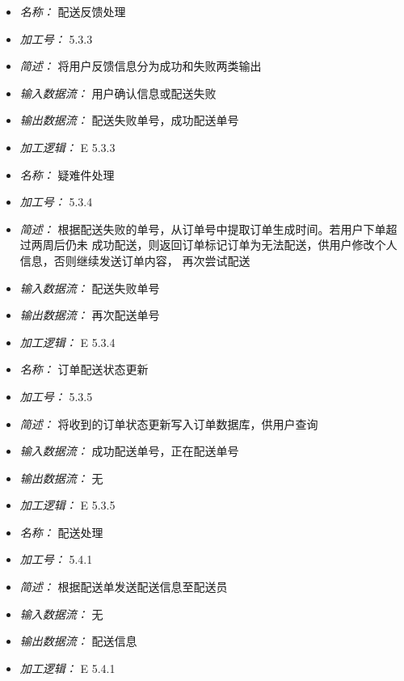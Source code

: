 \vspace{-1mm}


\begin{itemize}
\item \textit{名称： }配送反馈处理
\item \textit{加工号： }5.3.3
\item \textit{简述： } 将用户反馈信息分为成功和失败两类输出
\item \textit{输入数据流： } 用户确认信息或配送失败 
\item \textit{输出数据流： } 配送失败单号，成功配送单号 
\item \textit{加工逻辑： } E 5.3.3

\end{itemize}


\vspace{-1mm}


\begin{itemize}
\item \textit{名称： }疑难件处理
\item \textit{加工号： }5.3.4
\item \textit{简述： } 根据配送失败的单号，从订单号中提取订单生成时间。若用户下单超过两周后仍未 成功配送，则返回订单标记订单为无法配送，供用户修改个人信息，否则继续发送订单内容， 再次尝试配送
\item \textit{输入数据流： } 配送失败单号
\item \textit{输出数据流： } 再次配送单号
\item \textit{加工逻辑： } E 5.3.4

\end{itemize}


\vspace{-1mm}


\begin{itemize}
\item \textit{名称： }订单配送状态更新
\item \textit{加工号： }5.3.5
\item \textit{简述： } 将收到的订单状态更新写入订单数据库，供用户查询 
\item \textit{输入数据流： } 成功配送单号，正在配送单号
\item \textit{输出数据流： } 无
\item \textit{加工逻辑： } E 5.3.5

\end{itemize}


\vspace{-1mm}


\begin{itemize}
\item \textit{名称： }配送处理
\item \textit{加工号： }5.4.1
\item \textit{简述： } 根据配送单发送配送信息至配送员 
\item \textit{输入数据流： } 无
\item \textit{输出数据流： } 配送信息
\item \textit{加工逻辑： } E 5.4.1

\end{itemize}


